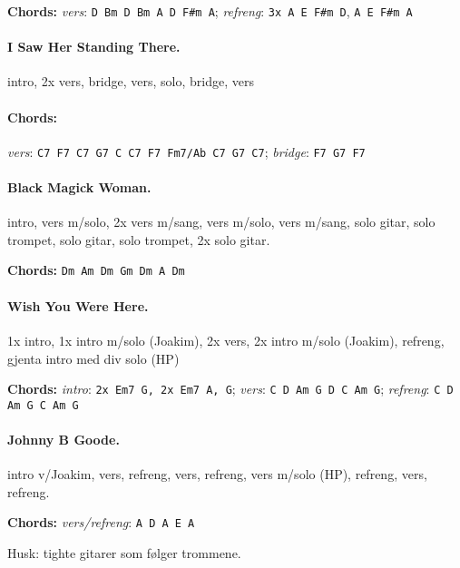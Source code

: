 \documentclass[%
twoside,                 %
final,                   %
10pt]{article}
\begin{document}
\textbf{Chords:} \emph{vers}: \Verb!D Bm D Bm A D F#m A!;
\emph{refreng}: \Verb!3x A E F#m D!, \Verb!A E F#m A!





\paragraph{I Saw Her Standing There.}
intro, 2x vers, bridge, vers, solo, bridge, vers

\paragraph{Chords:}
\emph{vers}: \Verb!C7 F7 C7 G7 C C7 F7 Fm7/Ab C7 G7 C7!; \emph{bridge}: \Verb!F7 G7 F7!









\paragraph{Black Magick Woman.}
intro, vers m/solo, 2x vers m/sang, vers m/solo, vers m/sang, solo gitar, solo trompet, solo gitar, solo trompet, 2x solo gitar.

\textbf{Chords:} \Verb!Dm Am Dm Gm Dm A Dm!






\paragraph{Wish You Were Here.}
1x intro, 1x intro m/solo (Joakim), 2x vers, 2x intro m/solo (Joakim), refreng,
gjenta intro med div solo (HP)


\textbf{Chords:} \emph{intro}: \Verb!2x Em7 G, 2x Em7 A, G!;
\emph{vers}: \Verb!C D Am G D C Am G!; \emph{refreng}: \Verb!C D Am G C Am G!





\paragraph{Johnny B Goode.}
intro v/Joakim, vers, refreng, vers, refreng, vers m/solo (HP), refreng,
vers, refreng.

\textbf{Chords:} \emph{vers/refreng}: \Verb!A D A E A!

Husk: tighte gitarer som følger trommene.
\end{document}
